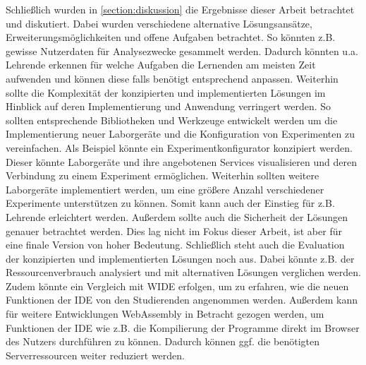 Schließlich wurden in \autoref{section:diskussion} die Ergebnisse dieser Arbeit betrachtet und diskutiert. Dabei wurden verschiedene alternative Lösungsansätze, Erweiterungsmöglichkeiten und offene Aufgaben betrachtet. So könnten z.B. gewisse Nutzerdaten für Analysezwecke gesammelt werden. Dadurch könnten u.a. Lehrende erkennen für welche Aufgaben die Lernenden am meisten Zeit aufwenden und können diese falls benötigt entsprechend anpassen. Weiterhin sollte die Komplexität der konzipierten und implementierten Lösungen im Hinblick auf deren Implementierung und Anwendung verringert werden. So sollten entsprechende Bibliotheken und Werkzeuge entwickelt werden um die Implementierung neuer Laborgeräte und die Konfiguration von Experimenten zu vereinfachen. Als Beispiel könnte ein Experimentkonfigurator konzipiert werden. Dieser könnte Laborgeräte und ihre angebotenen Services visualisieren und deren Verbindung zu einem Experiment ermöglichen. Weiterhin sollten weitere Laborgeräte implementiert werden, um eine größere Anzahl verschiedener Experimente unterstützen zu können. Somit kann auch der Einstieg für z.B. Lehrende erleichtert werden. Außerdem sollte auch die Sicherheit der Lösungen genauer betrachtet werden. Dies lag nicht im Fokus dieser Arbeit, ist aber für eine finale Version von hoher Bedeutung. Schließlich steht auch die Evaluation der konzipierten und implementierten Lösungen noch aus. Dabei könnte z.B. der Ressourcenverbrauch analysiert und mit alternativen Lösungen verglichen werden. Zudem könnte ein Vergleich mit WIDE erfolgen, um zu erfahren, wie die neuen Funktionen der IDE von den Studierenden angenommen werden. Außerdem kann für weitere Entwicklungen WebAssembly in Betracht gezogen werden, um Funktionen der IDE wie z.B. die Kompilierung der Programme direkt im Browser des Nutzers durchführen zu können. Dadurch können ggf. die benötigten Serverressourcen weiter reduziert werden.